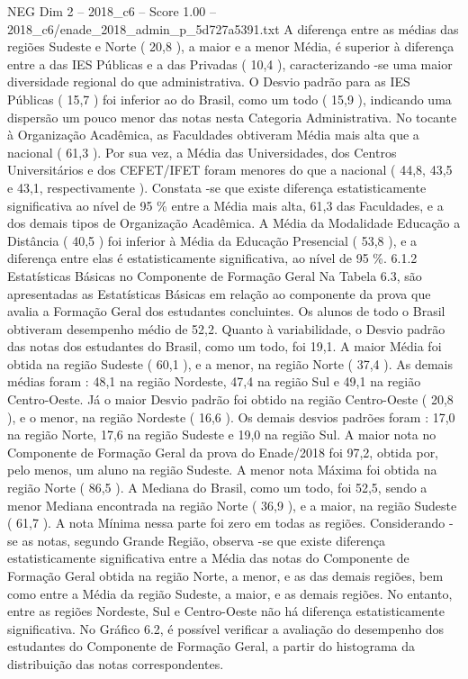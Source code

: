 \begin{textsample}{NEG Dim 2 – 2018\_c6 – Score 1.00 – 2018\_c6/enade\_2018\_admin\_p\_5d727a5391.txt}
A diferença entre as médias das regiões Sudeste e Norte ( 20,8 ), a maior e a menor Média, é superior à diferença entre a das IES Públicas e a das Privadas ( 10,4 ), caracterizando -se uma maior diversidade regional do que administrativa.
O Desvio padrão para as IES Públicas ( 15,7 ) foi inferior ao do Brasil, como um todo ( 15,9 ), indicando uma dispersão um pouco menor das notas nesta Categoria Administrativa.
No tocante à Organização Acadêmica, as Faculdades obtiveram Média mais alta que a nacional ( 61,3 ).
Por sua vez, a Média das Universidades, dos Centros Universitários e dos CEFET/IFET foram menores do que a nacional ( 44,8, 43,5 e 43,1, respectivamente ).
Constata -se que existe diferença estatisticamente significativa ao nível de 95 \% entre a Média mais alta, 61,3 das Faculdades, e a dos demais tipos de Organização Acadêmica.
A Média da Modalidade Educação a Distância ( 40,5 ) foi inferior à Média da Educação Presencial ( 53,8 ), e a diferença entre elas é estatisticamente significativa, ao nível de 95 \%. 6.1.2 Estatísticas Básicas no Componente de Formação Geral Na Tabela 6.3, são apresentadas as Estatísticas Básicas em relação ao componente da prova que avalia a Formação Geral dos estudantes concluintes.
Os alunos de todo o Brasil obtiveram desempenho médio de 52,2.
Quanto à variabilidade, o Desvio padrão das notas dos estudantes do Brasil, como um todo, foi 19,1.
A maior Média foi obtida na região Sudeste ( 60,1 ), e a menor, na região Norte ( 37,4 ).
As demais médias foram : 48,1 na região Nordeste, 47,4 na região Sul e 49,1 na região Centro-Oeste.
Já o maior Desvio padrão foi obtido na região Centro-Oeste ( 20,8 ), e o menor, na região Nordeste ( 16,6 ).
Os demais desvios padrões foram : 17,0 na região Norte, 17,6 na região Sudeste e 19,0 na região Sul.
A maior nota no Componente de Formação Geral da prova do Enade/2018 foi 97,2, obtida por, pelo menos, um aluno na região Sudeste.
A menor nota Máxima foi obtida na região Norte ( 86,5 ).
A Mediana do Brasil, como um todo, foi 52,5, sendo a menor Mediana encontrada na região Norte ( 36,9 ), e a maior, na região Sudeste ( 61,7 ).
A nota Mínima nessa parte foi zero em todas as regiões.
Considerando -se as notas, segundo Grande Região, observa -se que existe diferença estatisticamente significativa entre a Média das notas do Componente de Formação Geral obtida na região Norte, a menor, e as das demais regiões, bem como entre a Média da região Sudeste, a maior, e as demais regiões.
No entanto, entre as regiões Nordeste, Sul e Centro-Oeste não há diferença estatisticamente significativa.
No Gráfico 6.2, é possível verificar a avaliação do desempenho dos estudantes do Componente de Formação Geral, a partir do histograma da distribuição das notas correspondentes.

\end{textsample}
